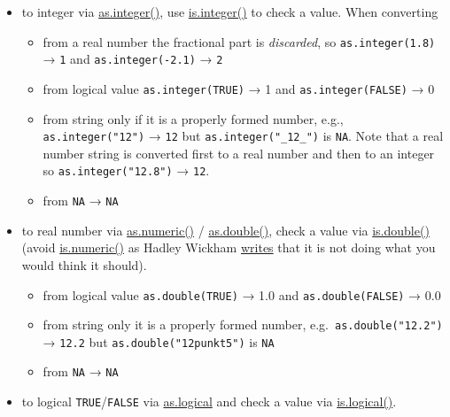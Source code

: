 \documentclass[
]{book}
\providecommand{\tightlist}{%
  \setlength{\itemsep}{0pt}\setlength{\parskip}{0pt}}
\begin{document}
\begin{itemize}
\tightlist
\item
  to integer via \href{https://stat.ethz.ch/R-manual/R-devel/library/base/html/integer.html}{as.integer()}, use \href{https://stat.ethz.ch/R-manual/R-devel/library/base/html/integer.html}{is.integer()} to check a value. When converting

  \begin{itemize}
  \tightlist
  \item
    from a real number the fractional part is \emph{discarded}, so \texttt{as.integer(1.8)} → \texttt{1} and \texttt{as.integer(-2.1)} → \texttt{2}
  \item
    from logical value \texttt{as.integer(TRUE)} → 1 and \texttt{as.integer(FALSE)} → 0
  \item
    from string only if it is a properly formed number, e.g., \texttt{as.integer("12")} → \texttt{12} but \texttt{as.integer("\_12\_")} is \texttt{NA}. Note that a real number string is converted first to a real number and then to an integer so \texttt{as.integer("12.8")} → \texttt{12}.
  \item
    from \texttt{NA} → \texttt{NA}
  \end{itemize}
\item
  to real number via \href{https://stat.ethz.ch/R-manual/R-devel/library/base/html/numeric.html}{as.numeric()} / \href{https://stat.ethz.ch/R-manual/R-devel/library/base/html/double.html}{as.double()}, check a value via \href{https://stat.ethz.ch/R-manual/R-devel/library/base/html/double.html}{is.double()} (avoid \href{https://stat.ethz.ch/R-manual/R-devel/library/base/html/numeric.html}{is.numeric()} as Hadley Wickham \href{https://adv-r.hadley.nz/vectors-chap.html}{writes} that it is not doing what you would think it should).

  \begin{itemize}
  \tightlist
  \item
    from logical value \texttt{as.double(TRUE)} → 1.0 and \texttt{as.double(FALSE)} → 0.0
  \item
    from string only it is a properly formed number, e.g.~\texttt{as.double("12.2")} → \texttt{12.2} but \texttt{as.double("12punkt5")} is \texttt{NA}
  \item
    from \texttt{NA} → \texttt{NA}
  \end{itemize}
\item
  to logical \texttt{TRUE}/\texttt{FALSE} via \href{https://stat.ethz.ch/R-manual/R-devel/library/base/html/logical.html}{as.logical} and check a value via \href{https://stat.ethz.ch/R-manual/R-devel/library/base/html/logical.html}{is.logical()}.


\end{itemize}
\end{document}
